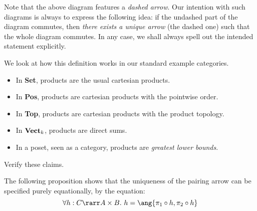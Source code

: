 \documentclass[12pt]{article}
\begin{document}
Note that the above diagram features a \emph{dashed arrow}. Our intention with such diagrams is always to express the following idea: if the undashed part of the diagram commutes, then \emph{there exists a unique arrow} (the dashed one) such that the whole diagram commutes. In any case, we shall always spell out the intended statement explicitly.

We look at how this definition works in our standard example categories.
\begin{itemize}
\item In \textbf{Set}, products are the usual cartesian products.
\item In \textbf{Pos}, products are cartesian products with the pointwise order.
\item In \textbf{Top}, products are cartesian products with the product topology.
\item In $\text{\textbf{Vect}}_k$,  products are direct sums.
\item In a poset, seen as a category, products are \emph{greatest lower bounds}.
\end{itemize}
\begin{myexercise}
Verify these claims.
\end{myexercise}
The following proposition shows that the uniqueness of the pairing arrow can be specified purely equationally, by the equation:
\[ \forall h:C\rarr A\times B.\ h=\ang{\pi_1\circ h,\pi_2\circ h} \]
\end{document}
